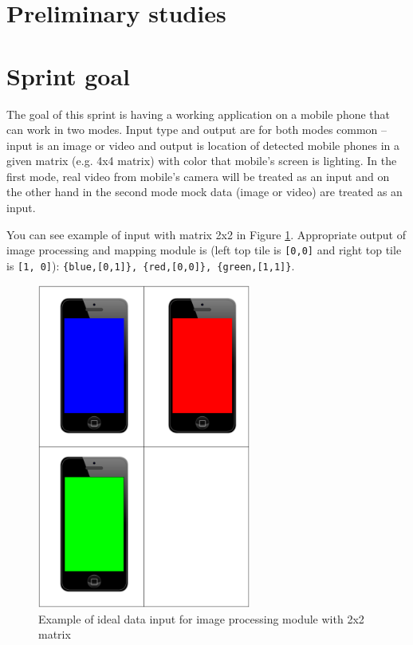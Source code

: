 \section{Preliminary studies}

\section{Sprint goal}
The goal of this sprint is having a working application on a mobile phone that can work in two modes.  
Input type and output are for both modes common -- input is an image or video and output is location of detected mobile phones in a given matrix (e.g. 4x4 matrix) with color that mobile's screen is lighting.
In the first mode, real video from mobile's camera will be treated as an input and on the other hand in the second mode mock data (image or video) are treated as an input.

You can see example of input with matrix 2x2 in Figure \ref{img:sprint3_goal}. 
Appropriate output of image processing and mapping module is (left top tile is \texttt{[0,0]} and right top tile is \texttt{[1, 0]}): \texttt{\{blue,[0,1]\}, \{red,[0,0]\}, \{green,[1,1]\}}.

\begin{figure}[h]
	\centering
		\includegraphics[width=7cm,angle=90]{sprint3/sprint3_goal.pdf}
	\caption[Goal for sprint 3]{Example of ideal data input for image processing module with 2x2 matrix}
	\label{img:sprint3_goal}
\end{figure}

